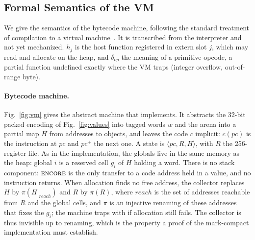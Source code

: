 
\newcommand{\kw}[1]{\mathsf{#1}}
\newcommand{\instr}[1]{\textsc{#1}}

\subsection{Formal Semantics of the VM}
\label{sec:semantics}

We give the semantics of the bytecode machine, following the standard treatment of compilation to a virtual machine~\cite{leroy2009mechanized}.
It is transcribed from the interpreter and not yet mechanized.
$h_j$ is the host function registered in extern slot $j$, which may read and allocate on the heap, and $\delta_{op}$ the meaning of a primitive opcode, a partial function undefined exactly where the VM traps (integer overflow, out-of-range byte).

\paragraph{Bytecode machine.}
Fig.~\ref{fig:vm} gives the abstract machine that  implements.
It abstracts the 32-bit packed encoding of Fig.~\ref{fig:values} into tagged words $w$ and the arena into a partial map $H$ from addresses to objects, and leaves the code $c$ implicit: $c(pc)$ is the instruction at $pc$ and $pc^{+}$ the next one.
A state is $\langle pc, R, H \rangle$, with $R$ the 256-register file. As in the implementation, the globals live in the same memory as the heap: global $i$ is a reserved cell $g_i$ of $H$ holding a word.
There is no stack component: $\instr{encore}$ is the only transfer to a code address held in a value, and no instruction returns.
When allocation finds no free address, the collector replaces $H$ by $\pi(H|_{\mathit{reach}})$ and $R$ by $\pi(R)$, where $\mathit{reach}$ is the set of addresses reachable from $R$ and the global cells, and $\pi$ is an injective renaming of these addresses that fixes the $g_i$; the machine traps with  if allocation still fails.
The collector is thus invisible up to renaming, which is the property a proof of the mark-compact implementation must establish.

